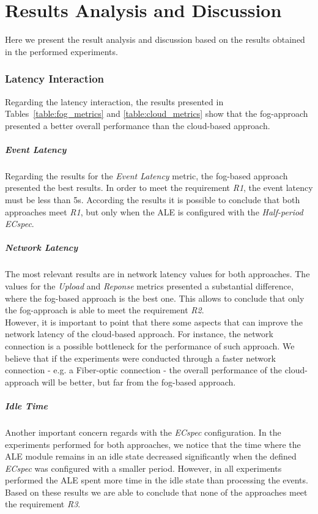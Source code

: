\section{Results Analysis and Discussion}
\label{sec:eval_analysis}
Here we present the result analysis and discussion based on the results obtained in the performed
experiments.

\subsubsection{Latency Interaction}
\label{subs:eval_results_latency}
Regarding the latency interaction, the results presented in Tables~\ref{table:fog_metrics} and
\ref{table:cloud_metrics} show that the fog-approach presented a better overall performance than
the cloud-based approach.

\subparagraph{Event Latency}
\label{subp:eval_event_latency}
Regarding the results for the \textit{Event Latency} metric, the fog-based approach presented the
best results. In order to meet the requirement \textit{R1}, the event latency must be less than
5s. According the results it is possible to conclude that both approaches meet \textit{R1}, but only
when the \gls{ALE} is configured with the \textit{Half-period ECspec}.

\subparagraph{Network Latency}
\label{subp:eval_network_latency}
The most relevant results are in network latency values for both approaches. The values for the \textit{Upload}
and \textit{Reponse} metrics presented a substantial difference, where the fog-based approach is the
best one. This allows to conclude that only the fog-approach is able to meet the requirement \textit{R2}.\\

However, it is important to point that there some aspects that can improve the network latency
of the cloud-based approach. For instance, the network connection is a possible bottleneck for the
performance of such approach. We believe that if the experiments were conducted through a faster
network connection - e.g. a Fiber-optic connection - the overall performance of the cloud-approach
will be better, but far from the fog-based approach.

\subparagraph{Idle Time}
\label{subp:eval_idle_time}
Another important concern regards with the \textit{ECspec} configuration. In the experiments
performed for both approaches, we notice that the time where the \gls{ALE} module remains in an idle
state decreased significantly when the defined \textit{ECspec} was configured with a smaller period.
However, in all experiments performed the \gls{ALE} spent more time in the idle state than
processing the events. Based on these results we are able to conclude that none of the approaches
meet the requirement \textit{R3}.

